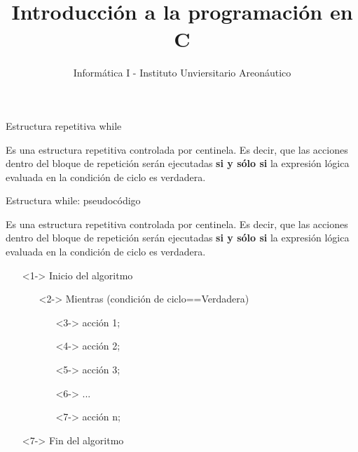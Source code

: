\documentclass[xcolor=pdftex,table,11pt]{beamer}
\author{Informática I - Instituto Unviersitario Areonáutico}
\title{Introducción a la programación en C}
\begin{document}
\begin{frame}
\titlepage
\end{frame}

\begin{frame}
\tableofcontents
\end{frame}






\begin{frame}{Estructura repetitiva while}
\begin{block}{}
 Es una estructura repetitiva controlada por centinela. Es decir, que las acciones dentro del bloque de repetición serán ejecutadas \textbf{si y sólo si} la expresión lógica evaluada en la condición de ciclo es verdadera. 
\end{block}
\end{frame}

\begin{frame}{Estructura while: pseudocódigo}

 \begin{block}{}
 Es una estructura repetitiva controlada por centinela. Es decir, que las acciones dentro del bloque de repetición serán ejecutadas \textbf{si y sólo si} la expresión lógica evaluada en la condición de ciclo es verdadera. 
\end{block}
\begin{itemize}
   \item[]<1-> Inicio del algoritmo

   \begin{itemize}
   		\item[]<2-> Mientras (condición de ciclo==Verdadera)
     	\begin{itemize}
     			\item[]<3->  acción 1;
     			\item[]<4->  acción 2;
     			\item[]<5->  acción 3;
     			\item[]<6->  ...
     			\item[]<7->  acción n;
     	\end{itemize}
   \end{itemize}
  \item[]<7-> Fin del algoritmo 
  
  
\end{itemize}



\end{frame}
\end{document}

